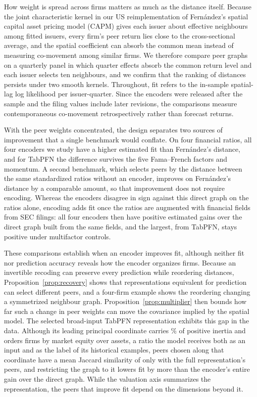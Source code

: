 How weight is spread across firms matters as much as the distance itself.
Because the joint characteristic kernel in our US reimplementation of
Fern\'andez's spatial capital asset pricing model (CAPM) gives each issuer
about  effective
neighbours among  fitted issuers, every
firm's peer return lies close to the cross-sectional average, and the
spatial coefficient can absorb the common mean instead of measuring
co-movement among similar firms. We therefore compare peer graphs on a
quarterly panel in which quarter effects absorb the common return level and
each issuer selects ten neighbours, and we confirm that the ranking of
distances persists under two smooth kernels. Throughout, fit refers to the
in-sample spatial-lag log likelihood per issuer-quarter. Since the encoders
were released after the sample and the filing values include later
revisions, the comparisons measure contemporaneous co-movement
retrospectively rather than forecast returns.

With the peer weights concentrated, the design separates two sources of
improvement that a single benchmark would conflate. On four financial
ratios, all four encoders we study have a higher estimated fit than
Fern\'andez's distance, and for TabPFN the difference survives the five
Fama--French factors and momentum. A second benchmark, which selects peers
by the distance between the same standardized ratios without an encoder,
improves on Fern\'andez's distance by a comparable amount, so that
improvement does not require encoding. Whereas the encoders disagree in
sign against this direct graph on the ratios alone, encoding adds fit once
the ratios are augmented with financial fields from SEC filings: all four
encoders then have positive estimated gains over the direct graph built
from the same fields, and the largest, from TabPFN, stays positive under
multifactor controls.

These comparisons establish when an encoder improves fit, although neither
fit nor prediction accuracy reveals how the encoder organizes firms.
Because an invertible recoding can preserve every prediction while
reordering distances, Proposition~\ref{prop:recovery} shows that
representations equivalent for prediction can select different peers, and a
four-firm example shows the reordering changing a symmetrized neighbour
graph. Proposition~\ref{prop:multiplier} then bounds how far such a change
in peer weights can move the covariance implied by the spatial model. The
selected broad-input TabPFN representation exhibits this gap in the data.
Although its leading principal coordinate carries \% of
positive inertia and orders firms by market equity over assets, a ratio the
model receives both as an input and as the label of its historical
examples, peers chosen along that coordinate have a mean Jaccard similarity
of only  with the full representation's peers, and
restricting the graph to it lowers fit by more than the encoder's entire
gain over the direct graph. While the valuation axis summarizes the
representation, the peers that improve fit depend on the dimensions beyond
it.

